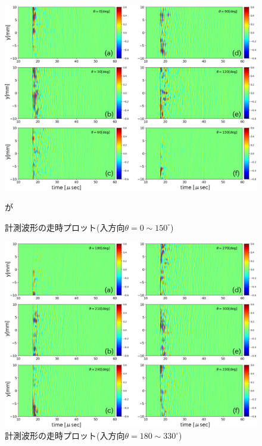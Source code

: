 \begin{figure}[h]
	\begin{center}
	\includegraphics[width=1.0\linewidth]{Figs/fig5_2.eps} 
	\end{center}
	\caption{
		計測波形の走時プロット(入方向$\theta=0\sim 150^{\circ}$)
	} 
	\label{fig:fig5_2}が
\end{figure}
\begin{figure}[h]
	\begin{center}
	\includegraphics[width=1.0\linewidth]{Figs/fig5_3.eps} 
	\end{center}
	\caption{
		計測波形の走時プロット(入方向$\theta=180\sim 330^{\circ}$)
	} 
	\label{fig:fig5_3}
\end{figure}
